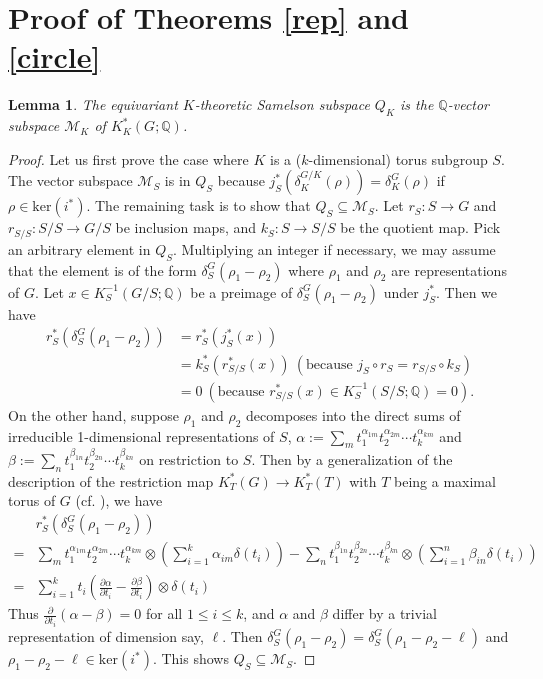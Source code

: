\documentclass[11pt]{amsart}
\theoremstyle{plain}
\newtheorem{lemma}[theorem]{Lemma}
\theoremstyle{definition}
\begin{document}
\section{Proof of Theorems \ref{rep} and \ref{circle}} 
\begin{lemma}\label{eqSam}
	The equivariant $K$-theoretic Samelson subspace $Q_K$ is the $\mathbb{Q}$-vector subspace $\mathcal{M}_K$ of $K_K^*(G; \mathbb{Q})$.
\end{lemma}
\begin{proof}
	Let us first prove the case where $K$ is a ($k$-dimensional) torus subgroup $S$. The vector subspace $\mathcal{M}_S$ is in $Q_S$ because $j_S^*(\delta_K^{G/K}(\rho))=\delta_K^G(\rho)$ if $\rho\in\text{ker}(i^*)$. The remaining task is to show that $Q_S\subseteq\mathcal{M}_S$. Let $r_S:S\to G$ and $r_{S/S}: S/S\to G/S$ be inclusion maps, and $k_S:S\to S/S$ be the quotient map. Pick an arbitrary element in $Q_S$. Multiplying an integer if necessary, we may assume that the element is of the form $\delta_S^G(\rho_1-\rho_2)$ where $\rho_1$ and $\rho_2$ are representations of $G$. Let $x\in K^{-1}_S(G/S; \mathbb{Q})$ be a preimage of $\delta_S^G(\rho_1-\rho_2)$ under $j_S^*$. Then we have 
	\begin{align*}
		r_S^*(\delta_S^G(\rho_1-\rho_2))&=r_S^*(j_S^*(x))\\
								&=k_S^*(r_{S/S}^*(x))\ (\text{because }j_S\circ r_S=r_{S/S}\circ k_S)\\
								&=0\ (\text{because }r_{S/S}^*(x)\in K_S^{-1}(S/S; \mathbb{Q})=0).
	\end{align*}
	On the other hand, suppose $\rho_1$ and $\rho_2$ decomposes into the direct sums of irreducible 1-dimensional representations of $S$, $\displaystyle\alpha:=\sum_m t_1^{\alpha_{1m}}t_2^{\alpha_{2m}}\cdots t_k^{\alpha_{km}}$ and $\displaystyle \beta:=\sum_n t_1^{\beta_{1n}}t_2^{\beta_{2n}}\cdots t_k^{\beta_{kn}}$ on restriction to $S$. Then by a generalization of the description of the restriction map $K_T^*(G)\to K_T^*(T)$ with $T$ being a maximal torus of $G$ (cf. \cite[Lemma 4.19]{F}), we have
	\begin{align*}
		&r_S^*(\delta_S^G(\rho_1-\rho_2))\\
		=&\sum_m t_1^{\alpha_{1m}}t_2^{\alpha_{2m}}\cdots t_k^{\alpha_{km}}\otimes\left(\sum_{i=1}^k\alpha_{im}\delta(t_i)\right)-\sum_n t_1^{\beta_{1n}}t_2^{\beta_{2n}}\cdots t_k^{\beta_{kn}}\otimes\left(\sum_{i=1}^n\beta_{in}\delta(t_i)\right)\\
		=&\sum_{i=1}^k t_i\left(\frac{\partial \alpha}{\partial t_i}-\frac{\partial\beta}{\partial t_i}\right)\otimes\delta(t_i)
	\end{align*}
	Thus $\displaystyle\frac{\partial}{\partial t_i}(\alpha-\beta)=0$ for all $1\leq i\leq k$, and $\alpha$ and $\beta$ differ by a trivial representation of dimension say, $\ell$. Then $\delta_S^G(\rho_1-\rho_2)=\delta_S^G(\rho_1-\rho_2-\ell)$ and $\rho_1-\rho_2-\ell\in\text{ker}(i^*)$. This shows $Q_S\subseteq \mathcal{M}_S$.
	

\end{proof}
\end{document}
